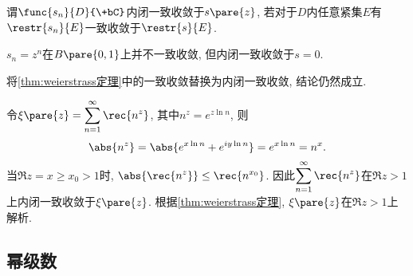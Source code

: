 \documentclass[../ComplexVariable.tex]{subfiles}
\begin{document}
\begin{definition}
    谓$\func{s_n}{D}{\+bC}$内闭一致收敛于$s\pare{z}$, 若对于$D$内任意紧集$E$有$\restr{s_n}{E}$一致收敛于$\restr{s}{E}$.
\end{definition}
\begin{ex}
    $s_n = z^n$在$B\pare{0,1}$上并不一致收敛, 但内闭一致收敛于$s=0$.
\end{ex}
\begin{remark}
    将\cref{thm:weierstrass定理}中的一致收敛替换为内闭一致收敛, 结论仍然成立.
\end{remark}
\begin{sample}
    \begin{ex}
        令$\displaystyle \xi\pare{z} = \sum_{n=1}^\infty \rec{n^z}$, 其中$n^z = e^{z\ln n}$, 则
        \[ \abs{n^z} = \abs{e^{x\ln n} + e^{iy\ln n}} = e^{x\ln n} = n^x. \]
        当$\Re z = x \ge x_0 > 1$时, $\displaystyle \abs{\rec{n^z}}\le\rec{n^{x_0}}$. 因此$\displaystyle \sum_{n=1}^\infty \rec{n^z}$在$\Re z>1$上内闭一致收敛于$\xi\pare{z}$. 根据\cref{thm:weierstrass定理}, $\xi\pare{z}$在$\Re z > 1$上解析.
    \end{ex}
\end{sample}


\subsection{幂级数} %
\label{sub:幂级数}
\end{document}
